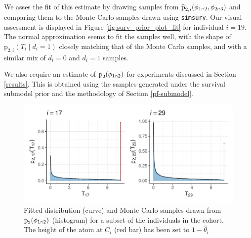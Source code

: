 \documentclass[
  10pt,
  a4paper,
]{article}
\let\Oldcap\cap
\renewcommand{\cap}{\mathrel{\mathsmaller{\Oldcap}}}
\newcommand{\pd}{\text{p}}
\begin{document}
We asses the fit of this estimate by drawing samples from
\(\widehat{\pd}_{2, i}(\phi_{1 \cap 2}, \phi_{2 \cap 3})\) and comparing
them to the Monte Carlo samples drawn using \texttt{simsurv}. Our visual
assessment is displayed in Figure \ref{fig:surv_prior_plot_fit} for
individual \(i = 19\). The normal approximation seems to fit the samples
well, with the shape of \(\pd_{2, i}(T_{i} \mid d_{i} = 1)\) closely
matching that of the Monte Carlo samples, and with a similar mix of
\(d_{i} = 0\) and \(d_{i} = 1\) samples.

We also require an estimate of \(\pd_{2}(\phi_{1 \cap 2})\) for
experiments discussed in Section \ref{results}. This is obtained using
the samples generated under the survival submodel prior and the
methodology of Section \ref{pf-submodel}.

\begin{figure}

{\centering \includegraphics{../plots/mimic-example/submodel-2-phi-12-marginal-fit-plot-small} 

}

\caption{Fitted distribution (curve) and Monte Carlo samples drawn from $\pd_{2}(\phi_{1 \cap 2})$ (histogram) for a subset of the individuals in the cohort. The height of the atom at $C_{i}$ (red bar) has been set to $1 - \widehat{\theta}_{i}$}\label{fig:surv_prior_phi_12_marginal_plot_fit}
\end{figure}
\end{document}
